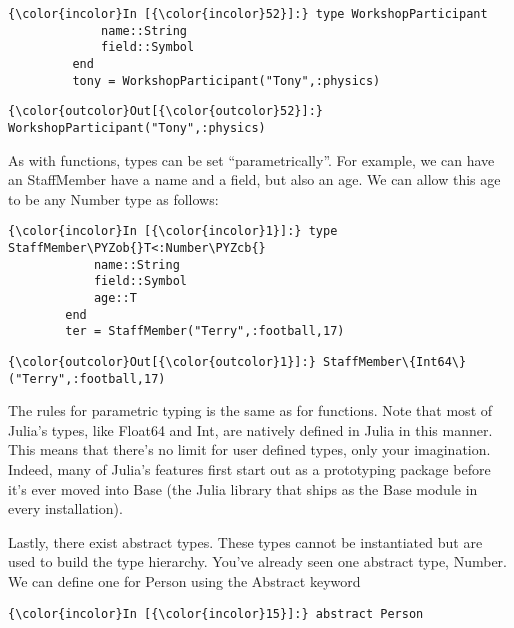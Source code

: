 \documentclass[11pt]{article}
\def\PYZob{\char`\{}
\def\PYZcb{\char`\}}
\begin{document}
    \begin{Verbatim}[commandchars=\\\{\}]
{\color{incolor}In [{\color{incolor}52}]:} type WorkshopParticipant
             name::String
             field::Symbol
         end
         tony = WorkshopParticipant("Tony",:physics)
\end{Verbatim}

            \begin{Verbatim}[commandchars=\\\{\}]
{\color{outcolor}Out[{\color{outcolor}52}]:} WorkshopParticipant("Tony",:physics)
\end{Verbatim}
        
    As with functions, types can be set ``parametrically''. For example, we
can have an StaffMember have a name and a field, but also an age. We can
allow this age to be any Number type as follows:

    \begin{Verbatim}[commandchars=\\\{\}]
{\color{incolor}In [{\color{incolor}1}]:} type StaffMember\PYZob{}T<:Number\PYZcb{}
            name::String
            field::Symbol
            age::T
        end
        ter = StaffMember("Terry",:football,17)
\end{Verbatim}

            \begin{Verbatim}[commandchars=\\\{\}]
{\color{outcolor}Out[{\color{outcolor}1}]:} StaffMember\{Int64\}("Terry",:football,17)
\end{Verbatim}
        
    The rules for parametric typing is the same as for functions. Note that
most of Julia's types, like Float64 and Int, are natively defined in
Julia in this manner. This means that there's no limit for user defined
types, only your imagination. Indeed, many of Julia's features first
start out as a prototyping package before it's ever moved into Base (the
Julia library that ships as the Base module in every installation).

Lastly, there exist abstract types. These types cannot be instantiated
but are used to build the type hierarchy. You've already seen one
abstract type, Number. We can define one for Person using the Abstract
keyword

    \begin{Verbatim}[commandchars=\\\{\}]
{\color{incolor}In [{\color{incolor}15}]:} abstract Person
\end{Verbatim}
\end{document}

